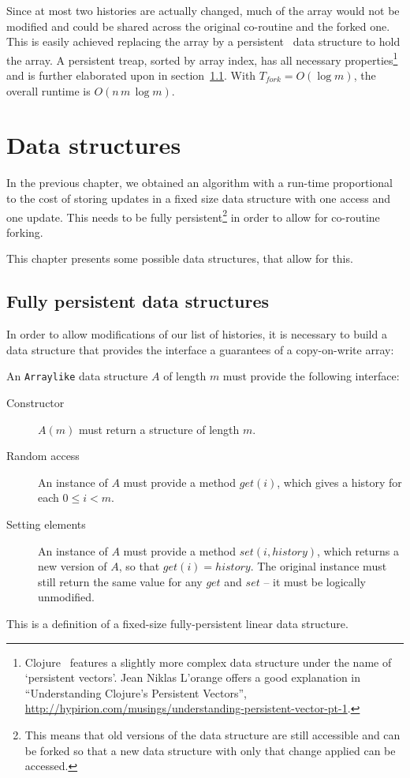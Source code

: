 \documentclass[11pt,a4paper,twoside,openright]{Thesis}
\theoremstyle{definition}
\newcommand{\Secref}[1]{section~\ref{sec:#1}}
\newcommand{\seclabel}[1]{\label{sec:#1}}
\begin{document}
Since at most two histories are actually changed, much of the
array would not be modified and could be shared across the original
co-routine and the forked one. This is easily achieved replacing the
array by a persistent~\cite{Dris89a} data structure to hold the
array. A persistent treap, sorted by array index, has all necessary
properties\footnote{Clojure~\cite{Hick08} features a slightly more complex data
structure under the name of `persistent vectors'. Jean Niklas L'orange offers a
good explanation in ``Understanding Clojure's Persistent Vectors'',
\url{http://hypirion.com/musings/understanding-persistent-vector-pt-1}.} and
is further elaborated upon in \Secref{treap}. With $T_{fork}=O(\log m)$,
the overall runtime is $O(n\,m\,\log m)$.

\chapter{Data structures}\label{cha:data}
In the previous chapter, we obtained an algorithm with a run-time
proportional to the cost of storing updates in a fixed size data structure
with one access and one update. This needs to be fully
persistent\footnote{This means that old versions of the data structure are
  still accessible and can be forked so that a new data structure with only
that change applied can be accessed.} in order to allow for co-routine forking.

This chapter presents some possible data structures, that allow for this.

\section{Fully persistent data structures}	\seclabel{treap}\seclabel{data-structures}
In order to allow modifications of our list of histories, it is
necessary to build a data structure that provides the interface a guarantees
of a copy-on-write array:

\begin{definition}
  An \texttt{Arraylike} data structure $A$ of length $m$ must provide the
  following interface:
  \begin{description}
    \item[Constructor] $A(m)$ must return a structure of length $m$.
    \item[Random access] An instance of $A$ must provide a method $get(i)$,
      which gives a history for each $0 \leq i < m$.
    \item[Setting elements] An instance of $A$ must provide a method $set(i,
      history)$, which returns a new version of $A$, so that $get(i) = history$.
      The original instance must still return the same value for any $get$
      and $set$ -- it must be logically unmodified.
  \end{description}

  This is a definition of a fixed-size fully-persistent linear data structure.
\end{definition}
\end{document}
